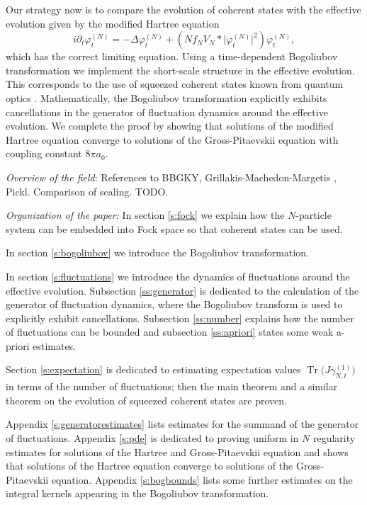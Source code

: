 \documentclass[11pt,a4paper,DIV11]{scrartcl}	%
\newcommand{\ph}{\varphi_t^{(N)}}	%
\newcommand{\Tr}{\operatorname{Tr}}	%
\newcommand{\be}[1]{\begin{equation}\label{eq:#1}}	%
\newcommand{\ee}{\end{equation}}
\begin{document}
Our strategy now is to compare the evolution of coherent states with the effective evolution given by the modified Hartree equation
\be{modHartreeEqu}
i \partial_t \ph = -\Delta \ph + \left(N f_N V_N \ast \lvert \ph\rvert^2 \right) \ph,
\ee
which has the correct limiting equation.
Using a time-dependent Bogoliubov transformation we implement the short-scale structure in the effective evolution. This corresponds to the use of squeezed coherent states known from quantum optics \cite{Loudon}. Mathematically, the Bogoliubov transformation explicitly exhibits cancellations in the generator of fluctuation dynamics around the effective evolution.
We complete the proof by showing that solutions of the modified Hartree equation converge to solutions of the Gross-Pitaevskii equation with coupling constant $8\pi a_0$.
\newline

\emph{Overview of the field}: References to BBGKY, Grillakis-Machedon-Margetis \cite{GMM2010}, Pickl. Comparison of scaling. TODO.\newline

\emph{Organization of the paper:}
In section \ref{s:fock} we explain how the $N$-particle system can be embedded into Fock space so that coherent states can be used.

In section \ref{s:bogoliubov} we introduce the Bogoliubov transformation.

In section \ref{s:fluctuations} we introduce the dynamics of fluctuations around the effective evolution. Subsection \ref{ss:generator} is dedicated to the calculation of the generator of fluctuation dynamics, where the Bogoliubov transform is used to explicitly exhibit cancellations. Subsection \ref{ss:number} explains how the number of fluctuations can be bounded and subsection \ref{ss:apriori} states some weak a-priori estimates.

Section \ref{s:expectation} is dedicated to estimating expectation values $\Tr\big(J \gamma_{N,t}^{(1)}\big)$ in terms of the number of fluctuations; then the main theorem and a similar theorem on the evolution of squeezed coherent states are proven.

Appendix \ref{s:generatorestimates} lists estimates for the summand of the generator of fluctuations. Appendix \ref{s:pde} is dedicated to proving uniform in $N$ regularity estimates for solutions of the Hartree and Gross-Pitaevskii equation and shows that solutions of the Hartree equation converge to solutions of the Gross-Pitaevskii equation. Appendix \ref{s:bogbounds} lists some further estimates on the integral kernels appearing in the Bogoliubov transformation.
\newline
\end{document}
